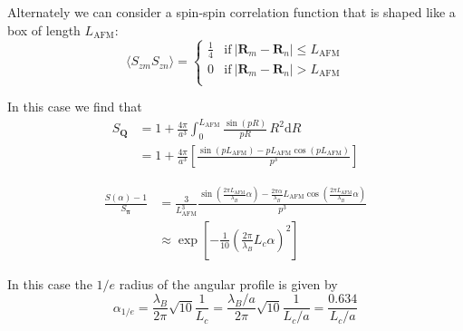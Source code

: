 \documentclass[11pt,letter]{article}
\newcommand{\bv}[1]{\ensuremath{\bm{#1}}}
\begin{document}
Alternately we can consider a spin-spin correlation function that is shaped
like a box of length $L_{\text{AFM}}$: 
\begin{equation}
 \langle S_{zm}S_{zn} \rangle  =  
  \begin{cases}  
   \frac{1}{4} &   \text{if}\ |\bv{R}_{m}-\bv{R}_{n}| \leq L_{\text{AFM}}\\ 
   0           &   \text{if}\ |\bv{R}_{m}-\bv{R}_{n}| > L_{\text{AFM}}\\ 
  \end{cases}
\end{equation}

In this case we find that 
\begin{equation}
\begin{split}
S_{\bv{Q}} & = 1 +  
   \frac{4\pi}{a^{3}}
   \int_{0}^{ L_{\text{AFM}}}  
   \frac{ \sin(pR)}{pR}\, R^{2} 
  \mathrm{d}R \\
   & = 1 + 
   \frac{4\pi}{a^{3}} \left[
   \frac{ \sin\left( p L_{\text{AFM}}\right ) 
              - p L_{\text{AFM}} \cos\left( p L_{\text{AFM}} \right) }
   { p^{3}} \right]
\end{split}
\end{equation}

\begin{equation}
\begin{split}
  \frac{ S(\alpha) - 1 }{ S_{\bv{\pi}} } & = 
   \frac{3}{L_{\text{AFM}}^{3}} 
   \frac{ \sin\left( \frac{2\pi L_{\text{AFM}}}{\lambda_{B}}\alpha\right ) 
              - \frac{2\pi\alpha}{\lambda_{B}} L_{\text{AFM}} 
     \cos\left( \frac{ 2\pi L_{\text{AFM}} }{\lambda_{B}} \alpha\right) }
   { p^{3}} \\ 
   & 
  \approx \exp\left[ - \frac{1}{10} \left( \frac{2\pi}{\lambda_{B}} L_{c} \alpha\right)^{2} \right]
\end{split}
\end{equation}

In this case the $1/e$ radius of the angular profile is given by 
\begin{equation}
 \alpha_{1/e} = \frac{ \lambda_{B}}{ 2\pi} \sqrt{10} \frac{1}{L_{c}}  
  =  \frac{ \lambda_{B}/a}{ 2\pi} \sqrt{10} \frac{1}{L_{c}/a}  
  =   \frac{0.634}{L_{c}/a} 
\end{equation}
\end{document}
